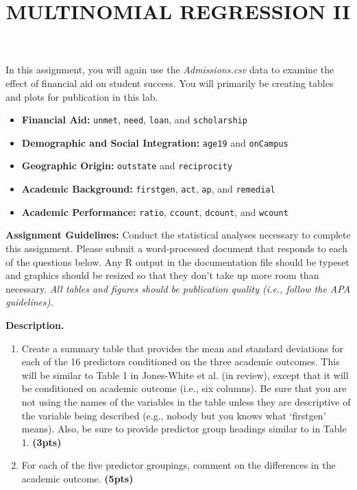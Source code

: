 \documentclass[]{article}\usepackage[]{graphicx}\usepackage[]{color}
\title{MULTINOMIAL REGRESSION II}
\author{}
\date{}
\begin{document}
\maketitle 
\thispagestyle{fancy}

\noindent In this assignment, you will again use the \textit{Admissions.csv} data to examine the effect of financial aid on student success. You will primarily be creating tables and plots for publication in this lab.

\begin{itemize}
\item \textbf{Financial Aid:} \texttt{unmet}, \texttt{need}, \texttt{loan}, and \texttt{scholarship}
\item \textbf{Demographic and Social Integration:} \texttt{age19} and \texttt{onCampus}
\item \textbf{Geographic Origin:} \texttt{outstate} and \texttt{reciprocity}
\item \textbf{Academic Background:} \texttt{firstgen}, \texttt{act}, \texttt{ap}, and \texttt{remedial}
\item \textbf{Academic Performance:} \texttt{ratio}, \texttt{ccount}, \texttt{dcount}, and \texttt{wcount}
\end{itemize}

\noindent \textbf{Assignment Guidelines:} Conduct the statistical analyses necessary to complete this assignment. Please submit a word-processed document that responds to each of the questions below. Any R output in the documentation file should be typeset and graphics should be resized so that they don't take up more room than necessary. \textit{All tables and figures should be publication quality (i.e., follow the APA guidelines).}



\noindent\textbf{Description.}

\begin{enumerate}[resume]
\item Create a summary table that provides the mean and standard deviations for each of the 16 predictors conditioned on the three academic outcomes. This will be similar to Table 1 in Jones-White et al. (in review), except that it will be conditioned on academic outcome (i.e., six columns). Be sure that you are not using the names of the variables in the table unless they are descriptive of the variable being described (e.g., nobody but you knows what `firstgen' means). Also, be sure to provide predictor group headings similar to in Table 1. \textbf{(3pts)} 
\item For each of the five predictor groupings, comment on the differences in the academic outcome. \textbf{(5pts)}
\end{enumerate}
\end{document}
